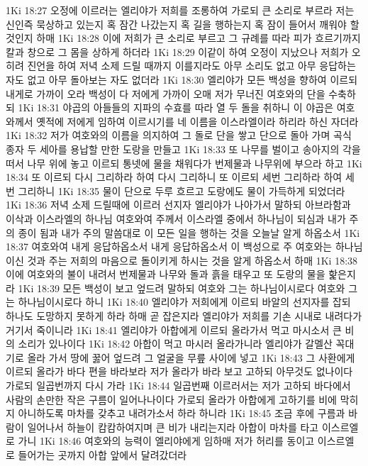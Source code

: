 1Ki 18:27  오정에 이르러는 엘리야가 저희를 조롱하여 가로되 큰 소리로 부르라 저는 신인즉 묵상하고 있는지 혹 잠간 나갔는지 혹 길을 행하는지 혹 잠이 들어서 깨워야 할 것인지 하매
1Ki 18:28  이에 저희가 큰 소리로 부르고 그 규례를 따라 피가 흐르기까지 칼과 창으로 그 몸을 상하게 하더라
1Ki 18:29  이같이 하여 오정이 지났으나 저희가 오히려 진언을 하여 저녁 소제 드릴 때까지 이를지라도 아무 소리도 없고 아무 응답하는 자도 없고 아무 돌아보는 자도 없더라
1Ki 18:30  엘리야가 모든 백성을 향하여 이르되 내게로 가까이 오라 백성이 다 저에게 가까이 오매 저가 무너진 여호와의 단을 수축하되
1Ki 18:31  야곱의 아들들의 지파의 수효를 따라 열 두 돌을 취하니 이 야곱은 여호와께서 옛적에 저에게 임하여 이르시기를 네 이름을 이스라엘이라 하리라 하신 자더라
1Ki 18:32  저가 여호와의 이름을 의지하여 그 돌로 단을 쌓고 단으로 돌아 가며 곡식 종자 두 세아를 용납할 만한 도랑을 만들고
1Ki 18:33  또 나무를 벌이고 송아지의 각을 떠서 나무 위에 놓고 이르되 통넷에 물을 채워다가 번제물과 나무위에 부으라 하고
1Ki 18:34  또 이르되 다시 그리하라 하여 다시 그리하니 또 이르되 세번 그리하라 하여 세번 그리하니
1Ki 18:35  물이 단으로 두루 흐르고 도랑에도 물이 가득하게 되었더라
1Ki 18:36  저녁 소제 드릴때에 이르러 선지자 엘리야가 나아가서 말하되 아브라함과 이삭과 이스라엘의 하나님 여호와여 주께서 이스라엘 중에서 하나님이 되심과 내가 주의 종이 됨과 내가 주의 말씀대로 이 모든 일을 행하는 것을 오늘날 알게 하옵소서
1Ki 18:37  여호와여 내게 응답하옵소서 내게 응답하옵소서 이 백성으로 주 여호와는 하나님이신 것과 주는 저희의 마음으로 돌이키게 하시는 것을 알게 하옵소서 하매
1Ki 18:38  이에 여호와의 불이 내려서 번제물과 나무와 돌과 흙을 태우고 또 도랑의 물을 핥은지라
1Ki 18:39  모든 백성이 보고 엎드려 말하되 여호와 그는 하나님이시로다 여호와 그는 하나님이시로다 하니
1Ki 18:40  엘리야가 저희에게 이르되 바알의 선지자를 잡되 하나도 도망하지 못하게 하라 하매 곧 잡은지라 엘리야가 저희를 기손 시내로 내려다가 거기서 죽이니라
1Ki 18:41  엘리야가 아합에게 이르되 올라가서 먹고 마시소서 큰 비의 소리가 있나이다
1Ki 18:42  아합이 먹고 마시러 올라가니라 엘리야가 갈멜산 꼭대기로 올라 가서 땅에 꿇어 엎드려 그 얼굴을 무릎 사이에 넣고
1Ki 18:43  그 사환에게 이르되 올라가 바다 편을 바라보라 저가 올라가 바라 보고 고하되 아무것도 없나이다 가로되 일곱번까지 다시 가라
1Ki 18:44  일곱번째 이르러서는 저가 고하되 바다에서 사람의 손만한 작은 구름이 일어나나이다 가로되 올라가 아합에게 고하기를 비에 막히지 아니하도록 마차를 갖추고 내려가소서 하라 하니라
1Ki 18:45  조금 후에 구름과 바람이 일어나서 하늘이 캄캄하여지며 큰 비가 내리는지라 아합이 마차를 타고 이스르엘로 가니
1Ki 18:46  여호와의 능력이 엘리야에게 임하매 저가 허리를 동이고 이스르엘로 들어가는 곳까지 아합 앞에서 달려갔더라
